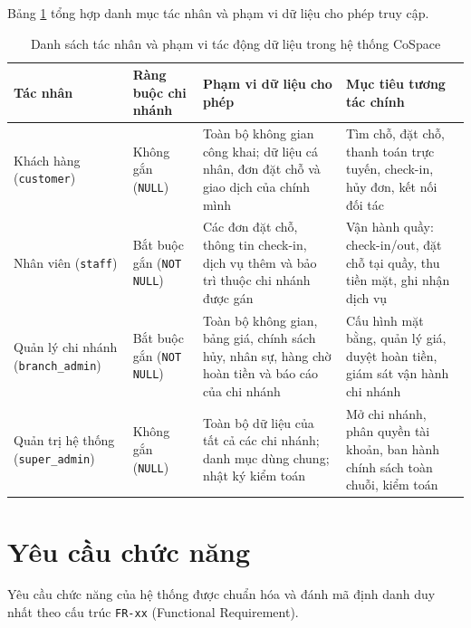 Bảng \ref{tab:tacnhan} tổng hợp danh mục tác nhân và phạm vi dữ liệu cho phép truy cập.

\begin{table}[H]
\centering
\caption{Danh sách tác nhân và phạm vi tác động dữ liệu trong hệ thống CoSpace}
\label{tab:tacnhan}
\small
\renewcommand{\arraystretch}{1.25}
\begin{tabular}{|p{2.8cm}|p{2.2cm}|p{4.6cm}|p{4.6cm}|}
\hline
\textbf{Tác nhân} & \textbf{Ràng buộc chi nhánh} & \textbf{Phạm vi dữ liệu cho phép} & \textbf{Mục tiêu tương tác chính} \\
\hline
Khách hàng (\texttt{customer}) & Không gắn (\texttt{NULL}) & Toàn bộ không gian công khai; dữ liệu cá nhân, đơn đặt chỗ và giao dịch của chính mình & Tìm chỗ, đặt chỗ, thanh toán trực tuyến, check-in, hủy đơn, kết nối đối tác \\
\hline
Nhân viên (\texttt{staff}) & Bắt buộc gắn (\texttt{NOT NULL}) & Các đơn đặt chỗ, thông tin check-in, dịch vụ thêm và bảo trì thuộc chi nhánh được gán & Vận hành quầy: check-in/out, đặt chỗ tại quầy, thu tiền mặt, ghi nhận dịch vụ \\
\hline
Quản lý chi nhánh (\texttt{branch\_admin}) & Bắt buộc gắn (\texttt{NOT NULL}) & Toàn bộ không gian, bảng giá, chính sách hủy, nhân sự, hàng chờ hoàn tiền và báo cáo của chi nhánh & Cấu hình mặt bằng, quản lý giá, duyệt hoàn tiền, giám sát vận hành chi nhánh \\
\hline
Quản trị hệ thống (\texttt{super\_admin}) & Không gắn (\texttt{NULL}) & Toàn bộ dữ liệu của tất cả các chi nhánh; danh mục dùng chung; nhật ký kiểm toán & Mở chi nhánh, phân quyền tài khoản, ban hành chính sách toàn chuỗi, kiểm toán \\
\hline
\end{tabular}
\end{table}

\section{Yêu cầu chức năng}
\label{sec:yeucau_chucnang}

Yêu cầu chức năng của hệ thống được chuẩn hóa và đánh mã định danh duy nhất theo cấu trúc \texttt{FR-xx} (Functional Requirement).

